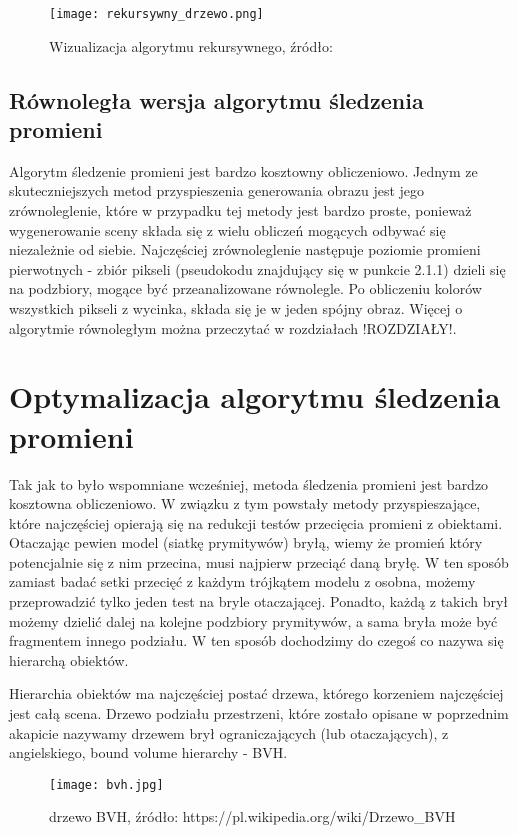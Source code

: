 \begin{figure}[h!]
\centering
  \caption{Wizualizacja algorytmu rekursywnego, źródło: \cite{scratch}}
  \texttt{[image: rekursywny\_drzewo.png]}
\end{figure}


\subsection{Równoległa wersja algorytmu śledzenia promieni}

Algorytm śledzenie promieni jest bardzo kosztowny obliczeniowo. Jednym ze skuteczniejszych metod przyspieszenia generowania obrazu jest jego zrównoleglenie, które w przypadku tej metody jest bardzo proste, ponieważ wygenerowanie sceny składa się z wielu obliczeń mogących odbywać się niezależnie od siebie. Najczęściej zrównoleglenie następuje poziomie promieni pierwotnych - zbiór pikseli (pseudokodu znajdujący się w punkcie 2.1.1) dzieli się na podzbiory, mogące być przeanalizowane równolegle. Po obliczeniu kolorów wszystkich pikseli z wycinka, składa się je w jeden spójny obraz. Więcej o algorytmie równoległym można przeczytać w rozdziałach !ROZDZIAŁY!.

\section{Optymalizacja algorytmu śledzenia promieni}

Tak jak to było wspomniane wcześniej, metoda śledzenia promieni jest bardzo kosztowna obliczeniowo. W związku z tym powstały metody przyspieszające, które najczęściej opierają się na redukcji testów przecięcia promieni z obiektami. Otaczając pewien model (siatkę prymitywów) bryłą, wiemy że promień który potencjalnie się z nim przecina, musi najpierw przeciąć daną bryłę. W ten sposób zamiast badać setki przecięć z każdym trójkątem modelu z osobna, możemy przeprowadzić tylko jeden test na bryle otaczającej. Ponadto, każdą z takich brył możemy dzielić dalej na kolejne podzbiory prymitywów, a sama bryła może być fragmentem innego podziału. W ten sposób dochodzimy do czegoś co nazywa się hierarchą obiektów.


Hierarchia obiektów ma najczęściej postać drzewa, którego korzeniem najczęściej jest całą scena. Drzewo podziału przestrzeni, które zostało opisane w poprzednim akapicie nazywamy drzewem brył ograniczających (lub otaczających), z angielskiego, bound volume hierarchy - BVH. 

\begin{figure}[h!]
\centering
  \caption{drzewo BVH, źródło: https://pl.wikipedia.org/wiki/Drzewo\_BVH}
  \texttt{[image: bvh.jpg]}
\end{figure}

